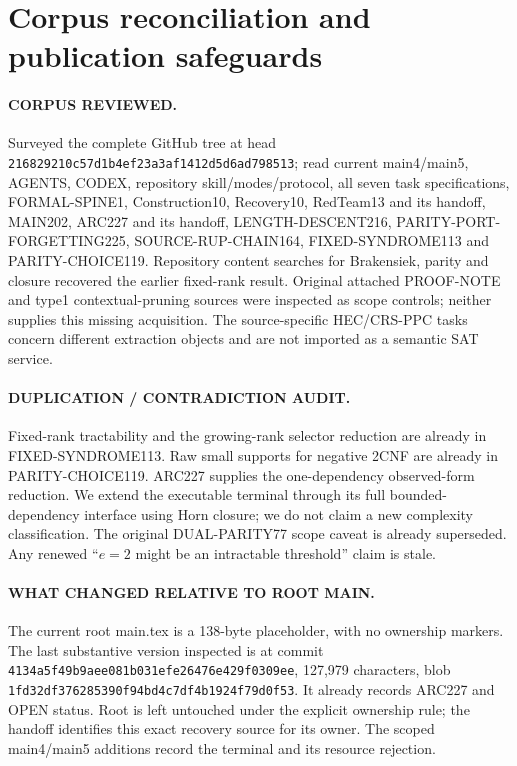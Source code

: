 \documentclass[11pt]{article}
\begin{document}
\section{Corpus reconciliation and publication safeguards}
\paragraph{CORPUS REVIEWED.}
Surveyed the complete GitHub tree at head
\texttt{216829210c57d1b4ef23a3af1412d5d6ad798513}; read current main4/main5,
AGENTS, CODEX, repository skill/modes/protocol, all seven task specifications,
FORMAL-SPINE1, Construction10, Recovery10, RedTeam13 and its handoff, MAIN202,
ARC227 and its handoff, LENGTH-DESCENT216, PARITY-PORT-FORGETTING225,
SOURCE-RUP-CHAIN164, FIXED-SYNDROME113 and PARITY-CHOICE119. Repository content
searches for Brakensiek, parity and closure recovered the earlier fixed-rank
result. Original attached PROOF-NOTE and type1 contextual-pruning sources
were inspected as scope controls; neither supplies this missing acquisition.
The source-specific HEC/CRS-PPC tasks concern different extraction objects
and are not imported as a semantic SAT service.

\paragraph{DUPLICATION / CONTRADICTION AUDIT.}
Fixed-rank tractability and the growing-rank selector reduction are already
in FIXED-SYNDROME113. Raw small supports for negative 2CNF are already in
PARITY-CHOICE119. ARC227 supplies the one-dependency observed-form reduction.
We extend the executable terminal through its full bounded-dependency
interface using Horn closure; we do not claim a new complexity classification.
The original DUAL-PARITY77 scope caveat is already superseded. Any renewed
``$e=2$ might be an intractable threshold'' claim is stale.

\paragraph{WHAT CHANGED RELATIVE TO ROOT MAIN.}
The current root main.tex is a 138-byte placeholder, with no ownership
markers. The last substantive version inspected is at commit
\texttt{4134a5f49b9aee081b031efe26476e429f0309ee}, 127,979 characters, blob
\texttt{1fd32df376285390f94bd4c7df4b1924f79d0f53}. It already records ARC227
and OPEN status. Root is left untouched under the explicit ownership rule;
the handoff identifies this exact recovery source for its owner. The scoped
main4/main5 additions record the terminal and its resource rejection.
\end{document}
